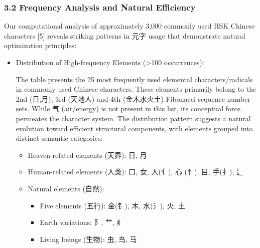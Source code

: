 \documentclass[
]{article}
\providecommand{\tightlist}{%
  \setlength{\itemsep}{0pt}\setlength{\parskip}{0pt}}
\begin{document}
\subsubsection{3.2 Frequency Analysis and Natural
Efficiency}\label{frequency-analysis-and-natural-efficiency}

Our computational analysis of approximately 3,000 commonly used HSK
Chinese characters {[}5{]} reveals striking patterns in 元字 usage that
demonstrate natural optimization principles:

\begin{itemize}
\item
  Distribution of High-frequency Elements (\textgreater100 occurrences):

  The table presents the 25 most frequently used elemental
  characters/radicals in commonly used Chinese characters. These
  elements primarily belong to the 2nd (日,月), 3rd (天地人) and 4th
  (金木水火土) Fibonacci sequence number sets. While 气 (air/energy) is
  not present in this list, its conceptual force permeates the character
  system. The distribution pattern suggests a natural evolution toward
  efficient structural components, with elements grouped into distinct
  semantic categories:

  \begin{itemize}
  \tightlist
  \item
    Heaven-related elements (天界): 日, 月
  \item
    Human-related elements (人类): 口, 女, 人(亻), 心 (忄), 目, 手(扌),
    辶
  \item
    Natural elements (自然):

    \begin{itemize}
    \tightlist
    \item
      Five elements (五行): 金(钅), 木, 水(氵), 火, 土
    \item
      Earth variations: 阝, 艹, 纟
    \item
      Living beings (生物): 虫, 鸟, 马
    \end{itemize}
  \end{itemize}


\end{itemize}
\end{document}
